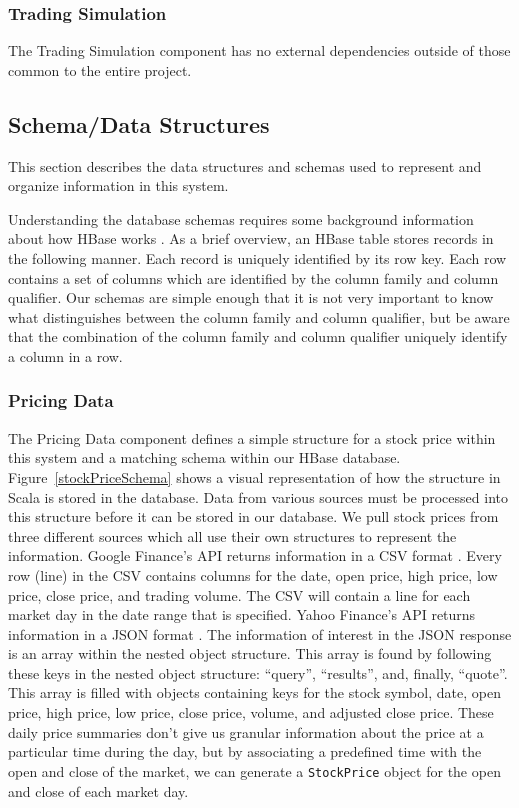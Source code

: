 \subsubsection{Trading Simulation}

The Trading Simulation component has no external dependencies outside of those common to the entire project.

\subsection{Schema/Data Structures}

This section describes the data structures and schemas used to represent and organize information in this system.

Understanding the database schemas requires some background information about how HBase works \cite{hbase}.
As a brief overview, an HBase table stores records in the following manner.
Each record is uniquely identified by its row key.
Each row contains a set of columns which are identified by the column family and column qualifier.
Our schemas are simple enough that it is not very important to know what distinguishes between the column family and column qualifier, but be aware that the combination of the column family and column qualifier uniquely identify a column in a row.

\subsubsection{Pricing Data}

The Pricing Data component defines a simple structure for a stock price within this system and a matching schema within our HBase database.
Figure~\ref{stockPriceSchema} shows a visual representation of how the structure in Scala is stored in the database.
Data from various sources must be processed into this structure before it can be stored in our database.
We pull stock prices from three different sources which all use their own structures to represent the information.
Google Finance's API returns information in a CSV format \cite{csv}.
Every row (line) in the CSV contains columns for the date, open price, high price, low price, close price, and trading volume.
The CSV will contain a line for each market day in the date range that is specified.
Yahoo Finance's API returns information in a JSON format \cite{json}.
The information of interest in the JSON response is an array within the nested object structure.
This array is found by following these keys in the nested object structure: ``query'', ``results'', and, finally, ``quote''.
This array is filled with objects containing keys for the stock symbol, date, open price, high price, low price, close price, volume, and adjusted close price.
These daily price summaries don't give us granular information about the price at a particular time during the day, but by associating a predefined time with the open and close of the market, we can generate a \texttt{StockPrice} object for the open and close of each market day.


